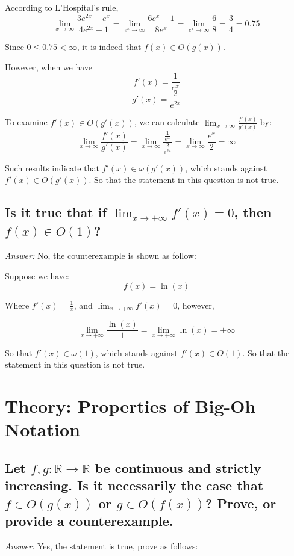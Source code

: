 \documentclass[11pt]{article}
\begin{document}
	According to L'Hospital's rule,
	\begin{equation*}
		\lim_{x\to\infty}\frac{3e^{2x}-e^x}{4e^{2x}-1}=\lim_{e^x\to\infty} \frac{6e^x-1}{8e^x} = \lim_{e^x\to\infty}\frac{6}{8} = \frac{3}{4} = 0.75
	\end{equation*}
	
	Since $0\leq0.75<\infty$, it is indeed that $f(x)\in O(g(x))$.
	
	However, when we have
	\begin{equation*}
		f'(x) = \frac{1}{e^x}
	\end{equation*}
	\begin{equation*}
		g'(x) = \frac{2}{e^{2x}}
	\end{equation*}
	
	To examine $f'(x)\in O(g'(x))$, we can calculate  $\lim_{x\to\infty}\frac{f'(x)}{g'(x)}$ by:
	\begin{equation*}
		\lim_{x\to\infty}\frac{f'(x)}{g'(x)}= \lim_{x\to\infty}\frac{\frac{1}{e^x}}{\frac{2}{e^{2x}}}=\lim_{x\to\infty}\frac{e^x}{2}=\infty
	\end{equation*}
	
	Such results indicate that $f'(x) \in \omega(g'(x))$, which stands against $f'(x)\in O(g'(x))$. So that the statement in this question is not true.
\subsection{Is it true that if $\lim_{x\to+\infty} f'(x)=0$, then $f(x)\in O(1)$?}
	\emph{Answer:} No, the counterexample is shown as follow:
	
	Suppose we have:
	\begin{equation*}
		f(x) = \ln(x)
	\end{equation*}
	
	Where $f'(x) = \frac{1}{x}$, and $\lim_{x\to+\infty} f'(x)=0$, however, 
	
	\begin{equation*}
		\lim_{x\to+\infty}\frac{\ln(x)}{1} = \lim_{x\to+\infty} \ln(x) = +\infty
	\end{equation*}
	
	So that $f'(x) \in \omega(1)$, which stands against $f'(x)\in O(1)$. So that the statement in this question is not true.
\section{Theory: Properties of Big-Oh Notation}
\subsection{Let $f,g: \mathbb{R} \to \mathbb{R}$ be continuous and strictly increasing. Is it necessarily the case that $f \in O(g(x))$ or $g \in O(f(x))$? Prove, or provide a counterexample.}
	\emph{Answer:} Yes, the statement is true, prove as follows:
	
\end{document}
